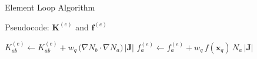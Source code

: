 \documentclass{beamer}
\begin{document}
\begin{frame}{Element Loop Algorithm}
\begin{minipage}{0.44\textwidth}
\begin{block}{\small Pseudocode: $\mathbf{K}^{(e)}$ and $\mathbf{f}^{(e)}$}
\begin{algorithmic}
				\State $K^{(e)}_{ab} \gets K^{(e)}_{ab} 
				+ w_q \, \big( \nabla N_b \cdot \nabla N_a \big) \, \big|\mathbf{J}\big|$
				\EndFor
				\State $f^{(e)}_a \gets f^{(e)}_a 
				+ w_q \, f(\mathbf{x}_q)\, N_a\, \big|\mathbf{J}\big|$
				\EndFor
				\EndFor
			\end{algorithmic}
		\end{block}
		
	\end{minipage}
\end{frame}
\end{document}

